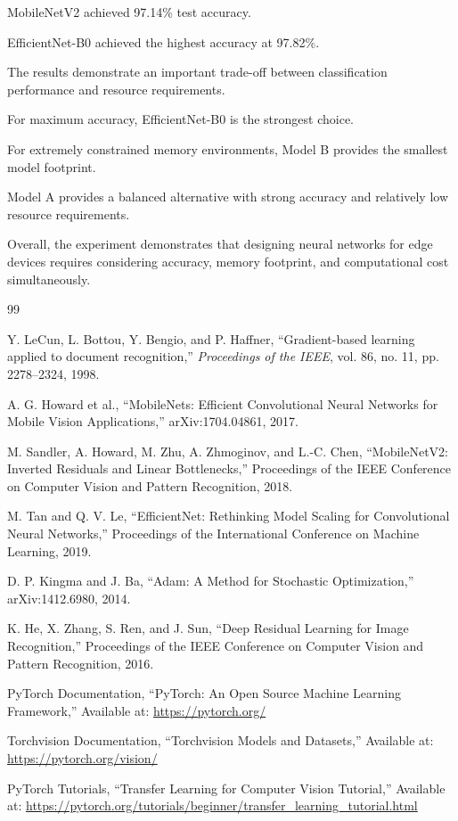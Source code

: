 \documentclass[12pt,a4paper]{report}
\begin{document}
MobileNetV2 achieved 97.14\% test accuracy.

EfficientNet-B0 achieved the highest accuracy at 97.82\%.

The results demonstrate an important trade-off between
classification performance and resource requirements.

For maximum accuracy, EfficientNet-B0 is the strongest choice.

For extremely constrained memory environments, Model B provides
the smallest model footprint.

Model A provides a balanced alternative with strong accuracy
and relatively low resource requirements.

Overall, the experiment demonstrates that designing neural
networks for edge devices requires considering accuracy,
memory footprint, and computational cost simultaneously.



\clearpage

\begin{thebibliography}{99}

Y. LeCun, L. Bottou, Y. Bengio, and P. Haffner,
``Gradient-based learning applied to document recognition,''
\textit{Proceedings of the IEEE},
vol. 86, no. 11, pp. 2278--2324, 1998.

A. G. Howard et al.,
``MobileNets: Efficient Convolutional Neural Networks for Mobile
Vision Applications,''
arXiv:1704.04861, 2017.

M. Sandler, A. Howard, M. Zhu, A. Zhmoginov, and L.-C. Chen,
``MobileNetV2: Inverted Residuals and Linear Bottlenecks,''
Proceedings of the IEEE Conference on Computer Vision and Pattern
Recognition, 2018.

M. Tan and Q. V. Le,
``EfficientNet: Rethinking Model Scaling for Convolutional Neural
Networks,''
Proceedings of the International Conference on Machine Learning,
2019.

D. P. Kingma and J. Ba,
``Adam: A Method for Stochastic Optimization,''
arXiv:1412.6980, 2014.

K. He, X. Zhang, S. Ren, and J. Sun,
``Deep Residual Learning for Image Recognition,''
Proceedings of the IEEE Conference on Computer Vision and Pattern
Recognition, 2016.

PyTorch Documentation,
``PyTorch: An Open Source Machine Learning Framework,''
Available at:
\url{https://pytorch.org/}

Torchvision Documentation,
``Torchvision Models and Datasets,''
Available at:
\url{https://pytorch.org/vision/}

PyTorch Tutorials,
``Transfer Learning for Computer Vision Tutorial,''
Available at:
\url{https://pytorch.org/tutorials/beginner/transfer_learning_tutorial.html}

\end{thebibliography}
\end{document}
